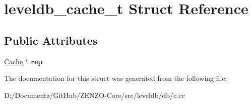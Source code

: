 \hypertarget{structleveldb__cache__t}{}\section{leveldb\+\_\+cache\+\_\+t Struct Reference}
\label{structleveldb__cache__t}
\subsection*{Public Attributes}
\begin{DoxyCompactItemize}
\item 
\mbox{\label{structleveldb__cache__t_a78f74e9a86ea86296e562fe990751a4a}} 
\mbox{\hyperlink{classleveldb_1_1_cache}{Cache}} $\ast$ {\bfseries rep}
\end{DoxyCompactItemize}


The documentation for this struct was generated from the following file\+:\begin{DoxyCompactItemize}
\item 
D\+:/\+Documentz/\+Git\+Hub/\+Z\+E\+N\+Z\+O-\/\+Core/src/leveldb/db/c.\+cc\end{DoxyCompactItemize}
